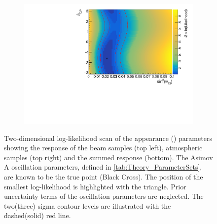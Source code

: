 \begin{figure}[h]
\begin{subfigure}[t]{1.0\textwidth}
    \includegraphics[width=\textwidth, trim={0mm 0mm 0mm 0mm}, clip,page=3]{Figures/OA/AppearanceScans.pdf}
  \end{subfigure}
  \caption{Two-dimensional log-likelihood scan of the appearance (\textendash{}) parameters showing the response of the beam samples (top left), atmospheric samples (top right) and the summed response (bottom). The Asimov A oscillation parameters, defined in \autoref{tab:Theory_ParameterSets}, are known to be the true point (Black Cross). The position of the smallest log-likelihood is highlighted with the triangle. Prior uncertainty terms of the oscillation parameters are neglected. The two(three) sigma contour levels are illustrated with the dashed(solid) red line.}
  \label{fig:OscillationAnalysis_2DLLHOscScans_App}
\end{figure}

